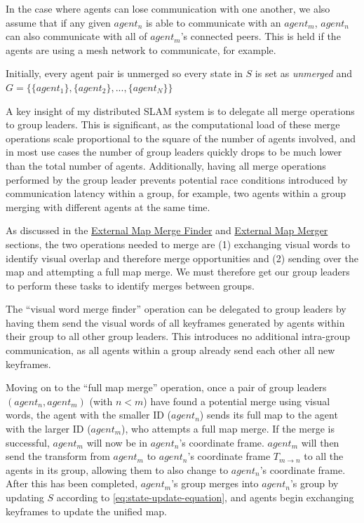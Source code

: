 In the case where agents can lose communication with one another, we also assume that if any given $agent_n$ is able to communicate with an $agent_m$, $agent_n$ can also communicate with all of $agent_m$'s connected peers. This is held if the agents are using a mesh network to communicate, for example.

Initially, every agent pair is unmerged so every state in $S$ is set as \textit{unmerged} and $G=\{\{agent_1\}, \{agent_2\}, ..., \{agent_N\}\}$

A key insight of my distributed SLAM system is to delegate all merge operations to group leaders. This is significant, as the computational load of these merge operations scale proportional to the square of the number of agents involved, and in most use cases the number of group leaders quickly drops to be much lower than the total number of agents. Additionally, having all merge operations performed by the group leader prevents potential race conditions introduced by communication latency within a group, for example, two agents within a group merging with different agents at the same time.

As discussed in the \hyperref[sec:external-map-merge-finder]{External Map Merge Finder} and \hyperref[sec:external-map-merger]{External Map Merger} sections, the two operations needed to merge are (1) exchanging visual words to identify visual overlap and therefore merge opportunities and (2) sending over the map and attempting a full map merge. We must therefore get our group leaders to perform these tasks to identify merges between groups.

The ``visual word merge finder'' operation can be delegated to group leaders by having them send the visual words of all keyframes generated by agents within their group to all other group leaders. This introduces no additional intra-group communication, as all agents within a group already send each other all new keyframes.

Moving on to the ``full map merge'' operation, once a pair of group leaders $(agent_n, agent_m)$ (with $n<m$) have found a potential merge using visual words, the agent with the smaller ID ($agent_n$) sends its full map to the agent with the larger ID ($agent_m$), who attempts a full map merge. If the merge is successful, $agent_m$ will now be in $agent_n$'s coordinate frame. $agent_m$ will then send the transform from $agent_m$ to $agent_n$'s coordinate frame $T_{m \to n}$ to all the agents in its group, allowing them to also change to $agent_n$'s coordinate frame. After this has been completed, $agent_m$'s group merges into $agent_n$'s group by updating $S$ according to \autoref{eq:state-update-equation}, and agents begin exchanging keyframes to update the unified map.


